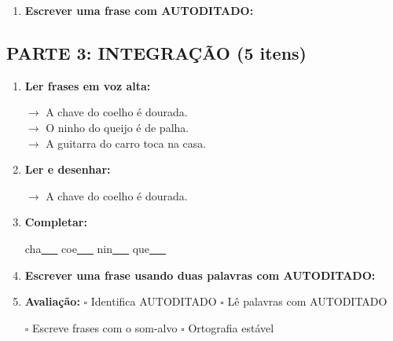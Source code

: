 \begin{exercicio}
\begin{enumerate}[resume]
  \item \textbf{Escrever uma frase com AUTODITADO:}
  \begin{center}
  \underline{\hspace{12cm}}
  \end{center}

\end{enumerate}

\subsection*{PARTE 3: INTEGRAÇÃO (5 itens)}

\begin{enumerate}[resume]

  \item \textbf{Ler frases em voz alta:}
  \begin{center}
  $\rightarrow$ A chave do coelho é dourada.\\
  $\rightarrow$ O ninho do queijo é de palha.\\
  $\rightarrow$ A guitarra do carro toca na casa.\\
  \end{center}

  \item \textbf{Ler e desenhar:}
  \begin{center}
  $\rightarrow$ A chave do coelho é dourada.
  \end{center}
  \begin{center}
  \end{center}

  \item \textbf{Completar:}
  \begin{center}
  cha\underline{~~~} \quad coe\underline{~~~} \quad nin\underline{~~~} \quad que\underline{~~~}
  \end{center}

  \item \textbf{Escrever uma frase usando duas palavras com AUTODITADO:}
  \begin{center}
  \underline{\hspace{12cm}}
  \end{center}

  \item \textbf{Avaliação:} $\square$ Identifica AUTODITADO \quad $\square$ Lê palavras com AUTODITADO
  \begin{center}
  $\square$ Escreve frases com o som-alvo \quad $\square$ Ortografia estável
  \end{center}


\end{enumerate}
\end{exercicio}
